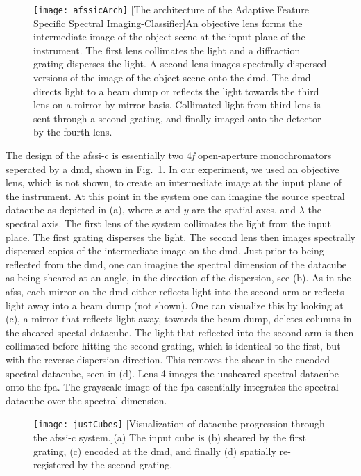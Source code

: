 \begin{figure}
	\texttt{[image: afssicArch]}
	[The architecture of the Adaptive Feature Specific Spectral Imaging-Classifier]{An objective lens forms the intermediate image of the object scene at the input plane of the instrument. The first lens collimates the light and a diffraction grating disperses the light. A second lens images spectrally dispersed versions of the image of the object scene onto the \gls{dmd}. The \gls{dmd} directs light to a beam dump or reflects the light towards the third lens on a mirror-by-mirror basis. Collimated light from third lens
is sent through a second grating, and finally imaged onto the detector by the fourth lens.}
	\label{fig:afssicArch}
\end{figure}


The design of the \gls{afssi-c} is essentially two 4\textit{f} open-aperture monochromators seperated by a \acrfull{dmd}, shown in Fig.~\ref{fig:afssicArch}. In our experiment, we used an objective lens, which is not shown, to create an intermediate image at the input plane of the instrument. At this point in the system one can imagine the source spectral datacube as depicted in (a), where $x$ and $y$ are the spatial axes, and $\lambda$ the spectral axis. The first lens of the system collimates the light from the input place. The first grating disperses the light. The second lens then images spectrally dispersed copies of the intermediate image on the \gls{dmd}. Just prior to being reflected from the \gls{dmd}, one can imagine the spectral dimension of the datacube as being sheared at an angle, in the direction of the dispersion, see (b). As in the \gls{afss}, each mirror on the \gls{dmd} either reflects light into the second arm or reflects light away into a beam dump (not shown). One can visualize this by looking at (c), a mirror that reflects light away, towards the beam dump, deletes columns in the sheared spectal datacube. The light that reflected into the second arm is then collimated before hitting the second grating, which is identical to the first, but with the reverse dispersion direction. This removes the shear in the encoded spectral datacube, seen in (d). Lens 4 images the unsheared spectral datacube onto the \gls{fpa}. The grayscale image of the \gls{fpa} essentially integrates the spectral datacube over the spectral dimension. 

\begin{figure}
	\texttt{[image: justCubes]}
	[Visualization of datacube progression through the \gls{afssi-c} system.]{(a) The input cube is (b) sheared by the first grating, (c) encoded at the \gls{dmd}, and finally (d) spatially re-registered by the second grating.}
	\label{fig:sysCubes}
\end{figure}


